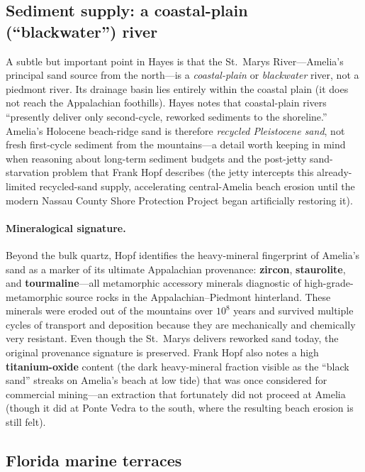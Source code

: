 \documentclass[11pt]{article}
\begin{document}
\subsection{Sediment supply: a coastal-plain (``blackwater'') river}

A subtle but important point in Hayes \cite{georgiabight} is that the St.\
Marys River---Amelia's principal sand source from the north---is a
\emph{coastal-plain} or \emph{blackwater} river, not a piedmont river. Its
drainage basin lies entirely within the coastal plain (it does not reach the
Appalachian foothills). Hayes notes that coastal-plain rivers ``presently
deliver only second-cycle, reworked sediments to the shoreline.'' Amelia's
Holocene beach-ridge sand is therefore \emph{recycled Pleistocene sand}, not
fresh first-cycle sediment from the mountains---a detail worth keeping in
mind when reasoning about long-term sediment budgets and the post-jetty
sand-starvation problem that Frank Hopf describes (the jetty intercepts
this already-limited recycled-sand supply, accelerating central-Amelia
beach erosion until the modern Nassau County Shore Protection Project
began artificially restoring it).

\paragraph{Mineralogical signature.}
Beyond the bulk quartz, Hopf \cite{cn_hopf_videoreport} identifies the
heavy-mineral fingerprint of Amelia's sand as a marker of its ultimate
Appalachian provenance: \textbf{zircon}, \textbf{staurolite}, and
\textbf{tourmaline}---all metamorphic accessory minerals diagnostic of
high-grade-metamorphic source rocks in the Appalachian--Piedmont
hinterland. These minerals were eroded out of the mountains over
$10^8$ years and survived multiple cycles of transport and deposition
because they are mechanically and chemically very resistant. Even
though the St.\ Marys delivers reworked sand today, the original
provenance signature is preserved. Frank Hopf also notes a high
\textbf{titanium-oxide} content (the dark heavy-mineral fraction
visible as the ``black sand'' streaks on Amelia's beach at low tide)
that was once considered for commercial mining---an extraction that
fortunately did not proceed at Amelia (though it did at Ponte Vedra
to the south, where the resulting beach erosion is still felt).

\subsection{Florida marine terraces}
\end{document}
